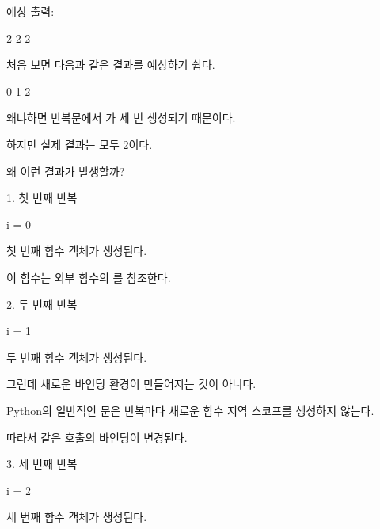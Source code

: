 예상 출력:

\begin{dhkzsh}
2
2
2
\end{dhkzsh}

처음 보면 다음과 같은 결과를 예상하기 쉽다.

\begin{dhkzsh}
0
1
2
\end{dhkzsh}

왜냐하면 반복문에서 가 세 번 생성되기 때문이다.

하지만 실제 결과는 모두 2이다.

왜 이런 결과가 발생할까?

\begin{dhknote}
\begin{dhksmry}[centered]
1. 첫 번째 반복
\end{dhksmry}
\end{dhknote}

\begin{dhkcode}
i = 0
\end{dhkcode}

첫 번째  함수 객체가 생성된다.

이 함수는 외부 함수의 를 참조한다.

\begin{dhknote}
\begin{dhksmry}[centered]
2. 두 번째 반복
\end{dhksmry}
\end{dhknote}

\begin{dhkcode}
i = 1
\end{dhkcode}

두 번째  함수 객체가 생성된다.

그런데 새로운  바인딩 환경이 만들어지는 것이 아니다.

Python의 일반적인 문은 반복마다 새로운 함수 지역 스코프를 생성하지 않는다.

따라서 같은  호출의  바인딩이 변경된다.

\begin{dhknote}
\begin{dhksmry}[centered]
3. 세 번째 반복
\end{dhksmry}
\end{dhknote}

\begin{dhkcode}
i = 2
\end{dhkcode}

세 번째  함수 객체가 생성된다.

